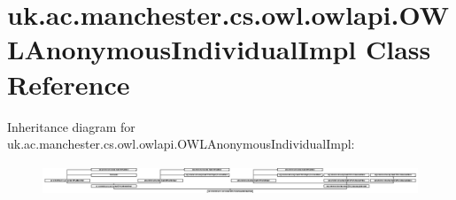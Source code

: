 \hypertarget{classuk_1_1ac_1_1manchester_1_1cs_1_1owl_1_1owlapi_1_1_o_w_l_anonymous_individual_impl}{\section{uk.\-ac.\-manchester.\-cs.\-owl.\-owlapi.\-O\-W\-L\-Anonymous\-Individual\-Impl Class Reference}
\label{classuk_1_1ac_1_1manchester_1_1cs_1_1owl_1_1owlapi_1_1_o_w_l_anonymous_individual_impl}
}
Inheritance diagram for uk.\-ac.\-manchester.\-cs.\-owl.\-owlapi.\-O\-W\-L\-Anonymous\-Individual\-Impl\-:\begin{figure}[H]
\begin{center}
\leavevmode
\includegraphics[height=0.935829cm]{classuk_1_1ac_1_1manchester_1_1cs_1_1owl_1_1owlapi_1_1_o_w_l_anonymous_individual_impl}
\end{center}
\end{figure}
